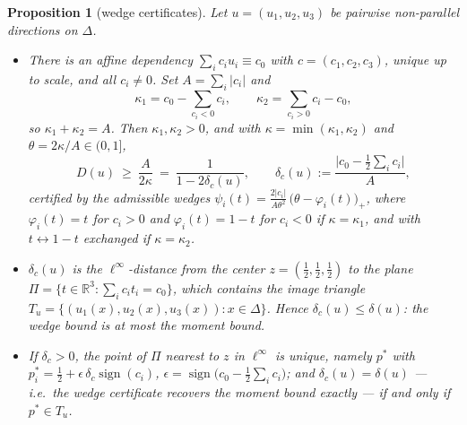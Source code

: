 \documentclass[11pt,reqno]{amsart}
\theoremstyle{plain}
\newtheorem{proposition}[theorem]{Proposition}
\theoremstyle{definition}
\theoremstyle{remark}
\newcommand{\R}{\mathbb{R}}
\begin{document}
\begin{proposition}[wedge certificates]\label{prop:wedge}
Let $u=(u_1,u_2,u_3)$ be pairwise non-parallel directions on $\Delta$.
\begin{itemize}
\item[(i)] There is an affine dependency $\sum_ic_iu_i\equiv c_0$ with
$c=(c_1,c_2,c_3)$, unique up to scale, and all $c_i\ne0$. Set
$A=\sum_i|c_i|$ and
\[
\kappa_1=c_0-\sum_{c_i<0}c_i,\qquad \kappa_2=\sum_{c_i>0}c_i-c_0 ,
\]
so $\kappa_1+\kappa_2=A$. Then $\kappa_1,\kappa_2>0$, and with
$\kappa=\min(\kappa_1,\kappa_2)$ and $\theta=2\kappa/A\in(0,1]$,
\[
D(u)\ \ge\ \frac{A}{2\kappa}\ =\ \frac1{1-2\delta_c(u)},\qquad
\delta_c(u):=\frac{\bigl|c_0-\tfrac12\sum_ic_i\bigr|}{A},
\]
certified by the admissible wedges
$\psi_i(t)=\frac{2|c_i|}{A\theta^2}\,\bigl(\theta-\varphi_i(t)\bigr)_+$, where
$\varphi_i(t)=t$ for $c_i>0$ and $\varphi_i(t)=1-t$ for $c_i<0$ if
$\kappa=\kappa_1$, and with $t\leftrightarrow1-t$ exchanged if
$\kappa=\kappa_2$.
\item[(ii)] $\delta_c(u)$ is the $\ell^\infty$-distance from the center
$z=(\tfrac12,\tfrac12,\tfrac12)$ to the plane
$\Pi=\{t\in\R^3:\sum_ic_it_i=c_0\}$, which contains the image triangle
$T_u=\{(u_1(x),u_2(x),u_3(x)):x\in\Delta\}$. Hence
$\delta_c(u)\le\delta(u)$: the wedge bound is at most the moment bound.
\item[(iii)] If $\delta_c>0$, the point of $\Pi$ nearest to $z$ in
$\ell^\infty$ is unique, namely $p^\ast$ with
$p^\ast_i=\tfrac12+\epsilon\,\delta_c\operatorname{sign}(c_i)$,
$\epsilon=\operatorname{sign}\bigl(c_0-\tfrac12\sum_ic_i\bigr)$; and
$\delta_c(u)=\delta(u)$ --- i.e.\ the wedge certificate recovers the moment
bound exactly --- if and only if $p^\ast\in T_u$.
\end{itemize}
\end{proposition}
\end{document}
